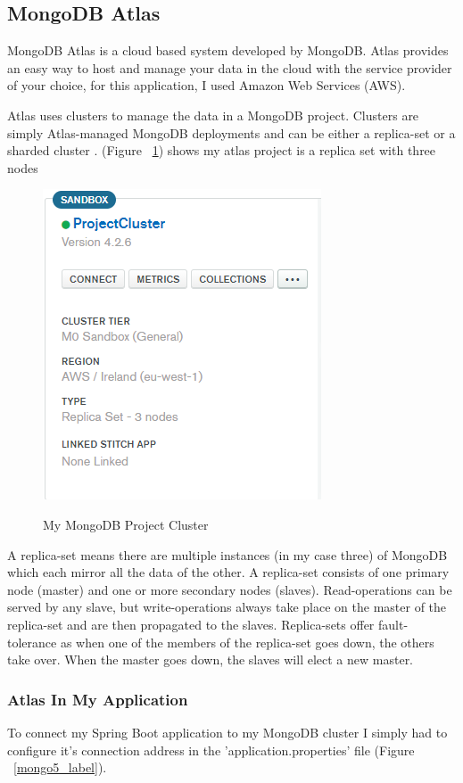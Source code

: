 \subsection{MongoDB Atlas}
MongoDB Atlas is a cloud based system developed by MongoDB. Atlas provides an easy way to host and manage your data in the cloud with the service provider of your choice, for this application, I used Amazon Web Services (AWS).

Atlas uses clusters to manage the data in a MongoDB project. Clusters are simply Atlas-managed MongoDB deployments and can be either a replica-set or a sharded cluster \cite{Mongo:clusters}. (Figure ~\ref{mongo3_label}) shows my atlas project is a replica set with three nodes

\begin{figure}[h]
    \centering
    \includegraphics[scale=0.4]{Images/mongo3.png} 
    \label{mongo3_label}
    \caption{My MongoDB Project Cluster}
\end{figure}
A replica-set means there are multiple instances (in my case three) of MongoDB which each mirror all the data of the other. A replica-set consists of one primary node (master) and one or more secondary nodes (slaves). Read-operations can be served by any slave, but write-operations always take place on the master of the replica-set and are then propagated to the slaves. Replica-sets offer fault-tolerance as when one of the members of the replica-set goes down, the others take over. When the master goes down, the slaves will elect a new master.

\newpage
\subsubsection{Atlas In My Application}
To connect my Spring Boot application to my MongoDB cluster I simply had to configure it's connection address in the 'application.properties' file (Figure ~\ref{mongo5_label}).

